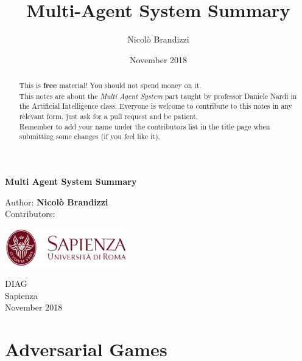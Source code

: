 \documentclass[10pt,a4paper]{article}
\author{Nicolò Brandizzi}
\title{Multi-Agent System Summary}
\date{November 2018}
\begin{document}
\begin{titlepage}
    \begin{center}
        \vspace*{1cm}
        
        \Huge
        \textbf{Multi Agent System Summary}
        
        
        \vspace{1.5cm}
        
        Author:
        \textbf{Nicolò Brandizzi}\\
        \vspace{0.5cm}
        \Large
        Contributors:
        \textbf{}%
        
        \vfill
        
        \includegraphics[width=0.4\textwidth]{images/sapienza_logo.jpg}


        
        \vfill
        
  

        \vspace{0.8cm}
        
        
        \Large
        DIAG\\
        Sapienza\\
        November 2018

    \end{center}
\end{titlepage}


\tableofcontents
\newpage
\begin{abstract}
This is \textbf{free} material! You should not spend money on it.\\
This notes are about the \textit{Multi Agent System} part taught by professor Daniele Nardi in the Artificial Intelligence class. Everyone is welcome to contribute to this notes in any relevant form, just ask for a pull request and be patient.\\ Remember to add your name under the contributors list in the title page when submitting some changes (if you feel like it).
\end{abstract}



\newpage


\section{Adversarial Games}
\end{document}
